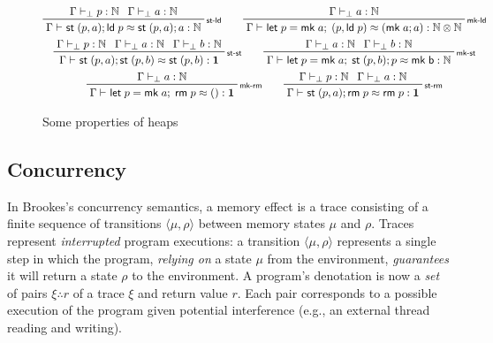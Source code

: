 \documentclass[acmsmall,screen,review]{acmart}
\newcommand{\mb}[1]{\ensuremath{\mathbf{#1}}}
\newcommand{\ms}[1]{\ensuremath{\mathsf{#1}}}
\newcommand{\nats}{\mathbb{N}}
\newcommand{\letexpr}[3]{\ensuremath{\ms{let}\;#1 = #2;\;#3}}
\newcommand{\rle}[1]{{\scriptsize\textsf{#1}}}
\newcommand{\hasty}[4]{#1 \vdash_{#2} #3: {#4}}
\newcommand{\teqv}{\approx}
\newcommand{\tmeq}[5]{#1 \vdash_{#2} #3 \teqv #4 : {#5}}
\newcommand{\tret}[2]{#1 \therefore #2}
\begin{document}
\begin{figure}
  \begin{gather*}
    \prftree[r]{\rle{st-ld}}
      {\hasty{\Gamma}{\bot}{p}{\nats}}
      {\hasty{\Gamma}{\bot}{a}{\nats}}
      {\tmeq{\Gamma}{}{\ms{st}\;(p, a) ; \ms{ld}\;p}{\ms{st}\;(p, a) ; a}{\nats}}
    \qquad
    \prftree[r]{\rle{mk-ld}}
      {\hasty{\Gamma}{\bot}{a}{\nats}}
      {\tmeq{\Gamma}{}{\letexpr{p}{\ms{mk}\;a}{(p, \ms{ld}\;p)}}
                                                 {(\ms{mk}\;a; a)}
                                                 {\nats \otimes \nats}}
    \\
    \prftree[r]{\rle{st-st}}
      {\hasty{\Gamma}{\bot}{p}{\nats}}
      {\hasty{\Gamma}{\bot}{a}{\nats}}
      {\hasty{\Gamma}{\bot}{b}{\nats}}
      {\tmeq{\Gamma}{}{\ms{st}\;(p, a) ; \ms{st}\;(p, b)}{\ms{st}\;(p, b)}{\mb{1}}}
    \qquad
    \prftree[r]{\rle{mk-st}}
      {\hasty{\Gamma}{\bot}{a}{\nats}}
      {\hasty{\Gamma}{\bot}{b}{\nats}}
      {\tmeq{\Gamma}{}{\letexpr{p}{\ms{mk}\;a}{\ms{st}\;(p, b) ; p}}
                                                  {\ms{mk\;b}}
                                                  {\nats}}
    \\
    \prftree[r]{\rle{mk-rm}}
      {\hasty{\Gamma}{\bot}{a}{\nats}}
      {\tmeq{\Gamma}{}{\letexpr{p}{\ms{mk}\;a}{\ms{rm}\;p}}{()}{\mb{1}}}
    \qquad
    \prftree[r]{\rle{st-rm}}
      {\hasty{\Gamma}{\bot}{p}{\nats}}
      {\hasty{\Gamma}{\bot}{a}{\nats}}
      {\tmeq{\Gamma}{}{\ms{st}\;(p, a) ; \ms{rm}\;p}{\ms{rm}\;p}{\mb{1}}}
    \\
  \end{gather*}
  \caption{Some properties of heaps}
  \label{fig:heap-eqns}
  \Description{}
\end{figure}

\subsection{Concurrency}

In Brookes's \cite{brookes-full-abstraction-96} concurrency semantics, a memory effect
is a trace consisting of a finite sequence of transitions $\langle \mu, \rho \rangle$ 
between memory states $\mu$ and $\rho$.
%
Traces represent \emph{interrupted} program executions: a transition $\langle \mu, \rho
\rangle$ represents a single step in which the program, \emph{relying on} a state $\mu$ from the
environment, \emph{guarantees} it will return a state $\rho$ to the environment.
%
A program's denotation is now a \emph{set} of pairs $\tret{\xi}{r}$ of a trace $\xi$ and
return value $r$. Each pair corresponds to a possible execution of the program
given potential interference (e.g., an external thread reading and writing).
\end{document}
